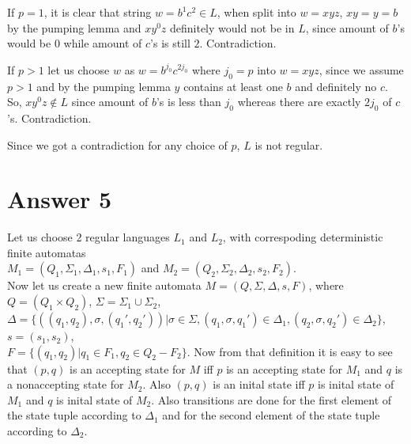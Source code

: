 \documentclass[12pt]{article}
\begin{document}
If $p=1$, it is clear that string $w=b^1c^2\in L$, when split into $w=xyz$, $xy=y=b$ by the pumping lemma
and $xy^0z$ definitely would not be in $L$, since amount of $b$'s would be $0$ while amount of $c$'s is still $2$.
Contradiction.

If $p>1$ let us choose $w$ as $w=b^{j_0}c^{2j_0}$ where $j_0=p$ into $w=xyz$, since we assume $p>1$ and by
the pumping lemma $y$ contains at least one $b$ and definitely no $c$. So, $xy^0z\notin L$ since amount of
$b$'s is less than $j_0$ whereas there are exactly $2j_0$ of $c$'s. Contradiction.

Since we got a contradiction for any choice of $p$, $L$ is not regular.



\section*{Answer 5}
Let us choose 2 regular languages $L_1$ and $L_2$, with correspoding deterministic finite automatas\\
$M_1=(Q_1, \Sigma_1, \Delta_1, s_1, F_1)$ and $M_2=(Q_2, \Sigma_2, \Delta_2, s_2, F_2)$.\\
Now let us create a new finite automata $M=(Q, \Sigma, \Delta, s, F)$, where $Q=(Q_1\times Q_2)$,
$\Sigma =\Sigma_1 \cup \Sigma_2$,\\
$\Delta =\{((q_1,q_2), \sigma, (q_1', q_2'))| \sigma \in \Sigma, (q_1,\sigma,q_1')\in \Delta_1, (q_2,\sigma,q_2')\in \Delta_2\}$,
$s=(s_1,s_2)$,\\ $F=\{(q_1, q_2) | q_1\in F_1, q_2\in Q_2-F_2\}$. Now from that definition it is easy
to see that $(p,q)$ is an accepting state for $M$ iff $p$ is an accepting state for $M_1$ and $q$ is
a nonaccepting state for $M_2$. Also $(p,q)$ is an inital state iff $p$ is inital state of $M_1$ and
$q$ is inital state of $M_2$. Also transitions are done for the first element of the state tuple
according to $\Delta_1$ and for the second element of the state tuple according to $\Delta_2$.
\end{document}
